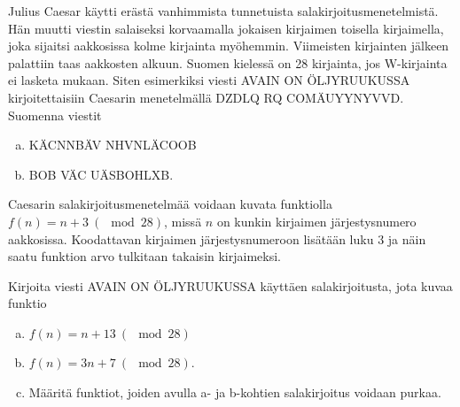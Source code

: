 \begin{tehtavasivu}
\begin{tehtava}
	Julius Caesar käytti erästä vanhimmista tunnetuista salakirjoitusmenetelmistä. Hän muutti viestin salaiseksi korvaamalla jokaisen kirjaimen toisella kirjaimella, joka sijaitsi aakkosissa kolme kirjainta myöhemmin. Viimeisten kirjainten jälkeen palattiin taas aakkosten alkuun. Suomen kielessä on 28 kirjainta, jos W-kirjainta ei lasketa mukaan. Siten esimerkiksi viesti AVAIN ON ÖLJYRUUKUSSA kirjoitettaisiin Caesarin menetelmällä DZDLQ RQ COMÄUYYNYVVD. Suomenna viestit 
	\begin{enumerate}[a)]
	\item KÄCNNBÄV NHVNLÄCOOB
	\item BOB VÄC UÄSBOHLXB.
	\end{enumerate}
\end{tehtava}

\begin{tehtava}
	Caesarin salakirjoitusmenetelmää voidaan kuvata funktiolla $f(n) = n + 3 \ (\mod 28)$, missä $n$ on kunkin kirjaimen järjestysnumero aakkosissa. Koodattavan kirjaimen järjestysnumeroon lisätään luku $3$ ja näin saatu funktion arvo tulkitaan takaisin kirjaimeksi.

	Kirjoita viesti AVAIN ON ÖLJYRUUKUSSA käyttäen salakirjoitusta, jota kuvaa funktio 
	\begin{enumerate}[a)]
	\item $f(n) = n + 13 \ (\mod 28)$
	\item $f(n) = 3n + 7 \ (\mod 28)$.
	\item Määritä funktiot, joiden avulla a- ja b-kohtien salakirjoitus voidaan purkaa.
	\end{enumerate}
\end{tehtava}

\end{tehtavasivu}


